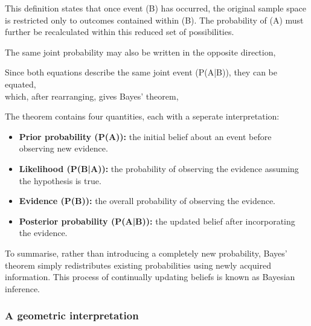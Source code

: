 This definition states that once event (B) has occurred, the original sample space is restricted only to outcomes contained within (B). The probability of (A) must further be recalculated within this reduced set of possibilities.

The same joint probability may also be written in the opposite direction,
\begin{equation}
[
P(B|A)=\frac{P(A\cap B)}{P(A)}.
]
\end{equation}

Since both equations describe the same joint event (P(A|B)), they can be equated,
\begin{equation}
[ 
P(A|B)P(B)=P(B|A)P(A),
]
\end{equation}
which, after rearranging, gives Bayes' theorem,
\begin{equation}
    [P(A|B)=\frac{P(B|A)P(A)}{P(B)}.]
\end{equation}

The theorem contains four quantities, each with a seperate interpretation:
\begin{itemize}
    \item \textbf{Prior probability (P(A)):} the initial belief about an event before observing new evidence.
\end{itemize}   
\begin{itemize}
    \item \textbf{Likelihood (P(B|A)):} the probability of observing the evidence assuming the hypothesis is true.
\end{itemize}   
\begin{itemize}
    \item \textbf{Evidence (P(B)):} the overall probability of observing the evidence.
\end{itemize}
\begin{itemize}
    \item \textbf{Posterior probability (P(A|B)):} the updated belief after incorporating the evidence.
\end{itemize}

To summarise, rather than introducing a completely new probability, Bayes' theorem simply redistributes existing probabilities using newly acquired information. This process of continually updating beliefs is known as Bayesian inference.
\subsubsection{A geometric interpretation}

